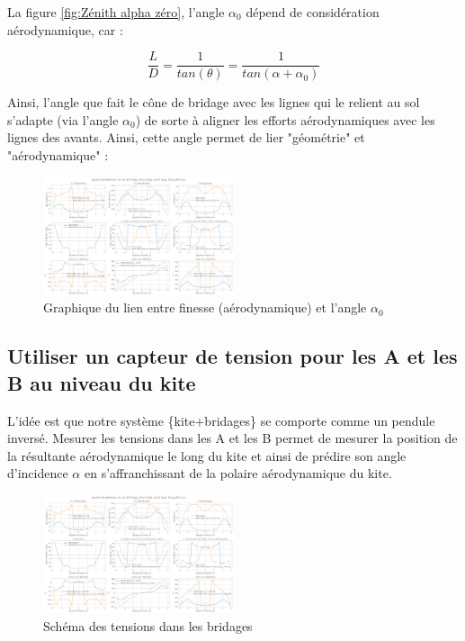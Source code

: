 \documentclass[conference]{IEEEtran}
\begin{document}
La figure \ref{fig:Zénith alpha zéro}, l'angle $\alpha_0$ dépend de considération aérodynamique, car : 
\begin{center}
    \begin{equation}
        \frac{L}{D} = \frac{1}{tan(\theta)} = \frac{1}{tan(\alpha + \alpha_0)}
    \end{equation}
\end{center}
Ainsi, l'angle que fait le cône de bridage avec les lignes qui le relient au sol s'adapte (via l'angle $\alpha_0$) de sorte à aligner les efforts aérodynamiques avec les lignes des avants. Ainsi, cette angle permet de lier "géométrie" et "aérodynamique" :  

\begin{figure}[H]
    \centering
    \includegraphics[width=0.5\textwidth]{Pics/circulation BEYOND.png}  
    \caption{Graphique du lien entre finesse (aérodynamique) et l'angle $\alpha_0$}
    \label{fig:Zénith finesse}
\end{figure}


\subsection{Utiliser un capteur de tension pour les A et les B au niveau du kite}

L'idée est que notre système \{kite+bridages\} se comporte comme un pendule inversé. Mesurer les tensions dans les A et les B permet de mesurer la position de la résultante aérodynamique le long du kite et ainsi de prédire son angle d'incidence $\alpha$ en s'affranchissant de la polaire aérodynamique du kite. 

\begin{figure}[H]
    \centering
    \includegraphics[width=0.5\textwidth]{Pics/circulation BEYOND.png}  
    \caption{Schéma des tensions dans les bridages}
    \label{fig:Zénith tensions AB}
\end{figure}
\end{document}
